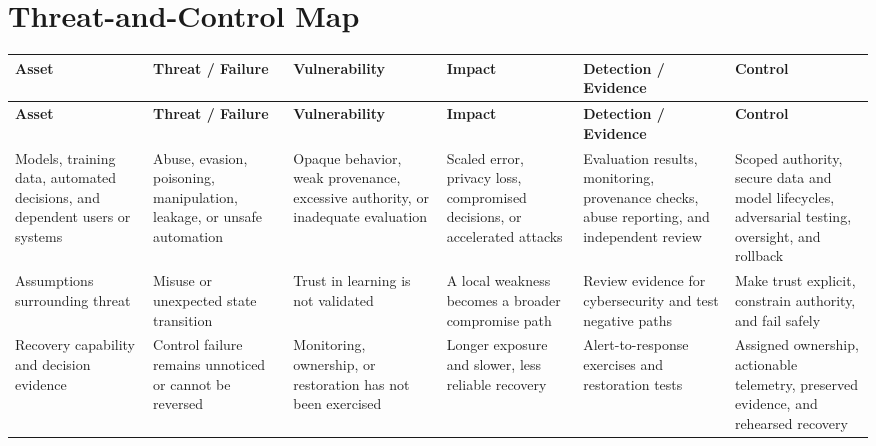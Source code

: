 \documentclass[11pt]{article}
\begin{document}
\section*{Threat-and-Control Map}
\begingroup\scriptsize\setlength{\tabcolsep}{2pt}
\begin{longtable}{>{\RaggedRight\arraybackslash}p{}>{\RaggedRight\arraybackslash}p{}>{\RaggedRight\arraybackslash}p{}>{\RaggedRight\arraybackslash}p{}>{\RaggedRight\arraybackslash}p{}>{\RaggedRight\arraybackslash}p{}}
\toprule\rowcolor{Navy}\color{white}\textbf{Asset} & \color{white}\textbf{Threat / Failure} & \color{white}\textbf{Vulnerability} & \color{white}\textbf{Impact} & \color{white}\textbf{Detection / Evidence} & \color{white}\textbf{Control}\\\midrule
\endfirsthead
\toprule\rowcolor{Navy}\color{white}\textbf{Asset} & \color{white}\textbf{Threat / Failure} & \color{white}\textbf{Vulnerability} & \color{white}\textbf{Impact} & \color{white}\textbf{Detection / Evidence} & \color{white}\textbf{Control}\\\midrule
\endhead
Models, training data, automated decisions, and dependent users or systems & Abuse, evasion, poisoning, manipulation, leakage, or unsafe automation & Opaque behavior, weak provenance, excessive authority, or inadequate evaluation & Scaled error, privacy loss, compromised decisions, or accelerated attacks & Evaluation results, monitoring, provenance checks, abuse reporting, and independent review & Scoped authority, secure data and model lifecycles, adversarial testing, oversight, and rollback\\\midrule
Assumptions surrounding threat & Misuse or unexpected state transition & Trust in learning is not validated & A local weakness becomes a broader compromise path & Review evidence for cybersecurity and test negative paths & Make trust explicit, constrain authority, and fail safely\\\midrule
Recovery capability and decision evidence & Control failure remains unnoticed or cannot be reversed & Monitoring, ownership, or restoration has not been exercised & Longer exposure and slower, less reliable recovery & Alert-to-response exercises and restoration tests & Assigned ownership, actionable telemetry, preserved evidence, and rehearsed recovery\\\midrule
\bottomrule
\end{longtable}
\endgroup
\end{document}
